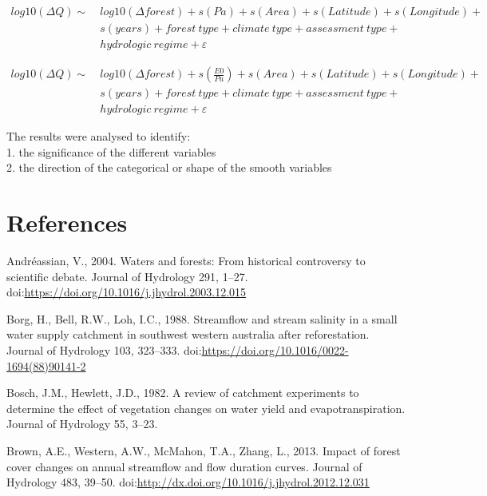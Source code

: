 \documentclass[]{elsarticle} %
\begin{document}
\[\tag{4}
\begin{aligned}
log10(\Delta Q) \sim ~&log10(\Delta forest) + s(Pa) + s(Area) + s(Latitude) + s(Longitude) + \\
& s(years) + {forest~type} + {climate~type} + {assessment~type} + \\ & {hydrologic~regime} + \varepsilon
\end{aligned}\]

\[\tag{5}
\begin{aligned}
log10(\Delta Q) \sim ~&log10(\Delta forest) + s(\frac{E0}{Pa}) + s(Area) + s(Latitude) + s(Longitude) + \\
& s(years) + {forest~type} + {climate~type} + {assessment~type} + \\ & {hydrologic~regime} + \varepsilon
\end{aligned}\]

The results were analysed to identify:\\
1. the significance of the different variables\\
2. the direction of the categorical or shape of the smooth variables

\hypertarget{references}{%
\section*{References}\label{references}}

\hypertarget{refs}{}
\leavevmode\hypertarget{ref-andreassian2004}{}%
Andréassian, V., 2004. Waters and forests: From historical controversy
to scientific debate. Journal of Hydrology 291, 1--27.
doi:\href{https://doi.org/https://doi.org/10.1016/j.jhydrol.2003.12.015}{https://doi.org/10.1016/j.jhydrol.2003.12.015}

\leavevmode\hypertarget{ref-borg1988}{}%
Borg, H., Bell, R.W., Loh, I.C., 1988. Streamflow and stream salinity in
a small water supply catchment in southwest western australia after
reforestation. Journal of Hydrology 103, 323--333.
doi:\href{https://doi.org/https://doi.org/10.1016/0022-1694(88)90141-2}{https://doi.org/10.1016/0022-1694(88)90141-2}

\leavevmode\hypertarget{ref-hewlett1984}{}%
Bosch, J.M., Hewlett, J.D., 1982. A review of catchment experiments to
determine the effect of vegetation changes on water yield and
evapotranspiration. Journal of Hydrology 55, 3--23.

\leavevmode\hypertarget{ref-brown2013}{}%
Brown, A.E., Western, A.W., McMahon, T.A., Zhang, L., 2013. Impact of
forest cover changes on annual streamflow and flow duration curves.
Journal of Hydrology 483, 39--50.
doi:\href{https://doi.org/http://dx.doi.org/10.1016/j.jhydrol.2012.12.031}{http://dx.doi.org/10.1016/j.jhydrol.2012.12.031}
\end{document}
